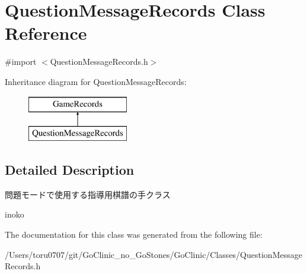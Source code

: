 \hypertarget{interface_question_message_records}{
\section{QuestionMessageRecords Class Reference}
\label{interface_question_message_records}
}


{\ttfamily \#import $<$QuestionMessageRecords.h$>$}

Inheritance diagram for QuestionMessageRecords:\begin{figure}[H]
\begin{center}
\leavevmode
\includegraphics[height=2.000000cm]{interface_question_message_records}
\end{center}
\end{figure}


\subsection{Detailed Description}
問題モードで使用する指導用棋譜の手クラス

inoko 

The documentation for this class was generated from the following file:\begin{DoxyCompactItemize}
\item 
/Users/toru0707/git/GoClinic\_\-no\_\-GoStones/GoClinic/Classes/QuestionMessageRecords.h\end{DoxyCompactItemize}
